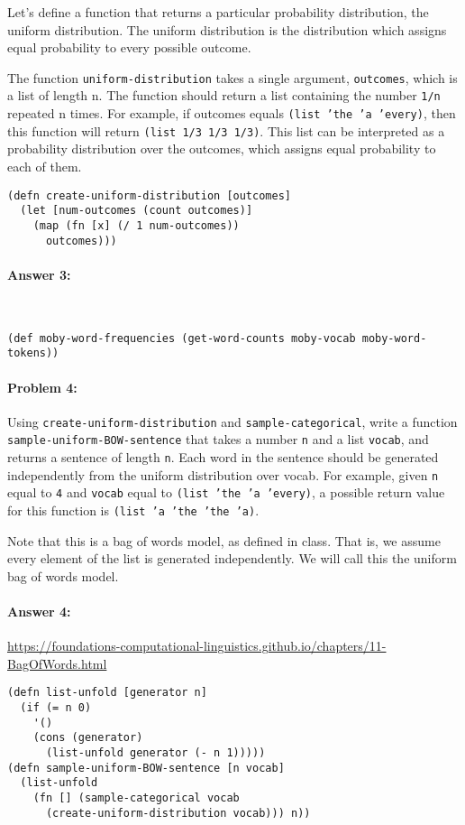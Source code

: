 \documentclass[12pt, letterpaper]{article}
\begin{document}
Let's define a function that returns a particular probability
distribution, the uniform distribution. The uniform distribution is
the distribution which assigns equal probability to every possible
outcome.
  
The function \texttt{uniform-distribution} takes a single argument,
\texttt{outcomes}, which is a list of length n. The function should
return a list containing the number \texttt{1/n} repeated n times. For
example, if outcomes equals \texttt{(list 'the 'a 'every)}, then this
function will return \texttt{(list 1/3 1/3 1/3)}. This list can be
interpreted as a probability distribution over the outcomes, which
assigns equal probability to each of them.

\begin{lstlisting}
(defn create-uniform-distribution [outcomes]
  (let [num-outcomes (count outcomes)]
    (map (fn [x] (/ 1 num-outcomes))
      outcomes)))
\end{lstlisting}


\paragraph{Answer 3:}~\begin{lstlisting}
(def moby-word-frequencies (get-word-counts moby-vocab moby-word-tokens))
\end{lstlisting}

\hrulefill
\paragraph{Problem 4:}

Using \texttt{create-uniform-distribution} and
\texttt{sample-categorical}, write a function
\texttt{sample-uniform-BOW-sentence} that takes a number \texttt{n}
and a list \texttt{vocab}, and returns a sentence of length
\texttt{n}. Each word in the sentence should be generated
independently from the uniform distribution over vocab. For example,
given \texttt{n} equal to \texttt{4} and \texttt{vocab} equal to
\texttt{(list 'the 'a 'every)}, a possible return value for this
function is \texttt{(list 'a 'the 'the 'a)}.

Note that this is a bag of words model, as defined in class. That is,
we assume every element of the list is generated independently. We
will call this the uniform bag of words model.

\paragraph{Answer 4:} \url{https://foundations-computational-linguistics.github.io/chapters/11-BagOfWords.html}
\begin{lstlisting}
(defn list-unfold [generator n]
  (if (= n 0)
    '()
    (cons (generator)
      (list-unfold generator (- n 1)))))
(defn sample-uniform-BOW-sentence [n vocab]
  (list-unfold 
    (fn [] (sample-categorical vocab
      (create-uniform-distribution vocab))) n))
\end{lstlisting}
\end{document}
